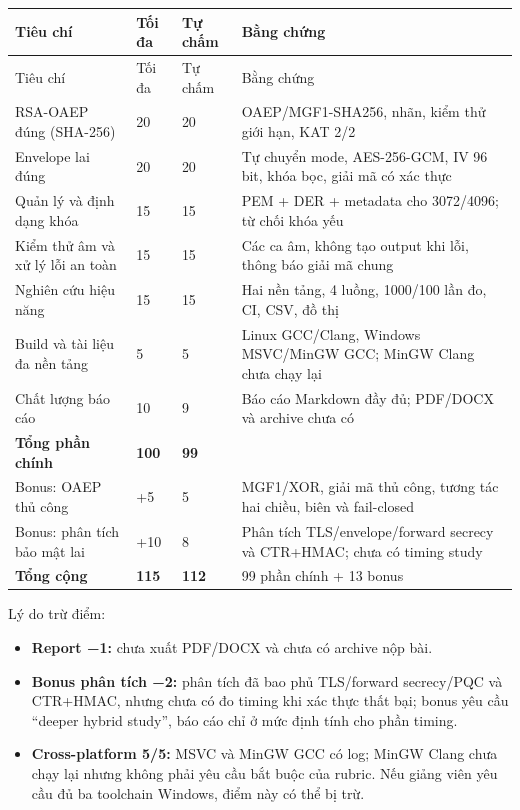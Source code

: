\documentclass[12pt,a4paper,oneside]{report}
\begin{document}
\begin{longtable}{p{}p{}p{}p{}}
\toprule
Tiêu chí & Tối đa & Tự chấm & Bằng chứng \\
\midrule
\endfirsthead
\toprule
Tiêu chí & Tối đa & Tự chấm & Bằng chứng \\
\midrule
\endhead
RSA-OAEP đúng (SHA-256) & 20 & 20 & OAEP/MGF1-SHA256, nhãn, kiểm thử giới hạn, KAT 2/2 \\
Envelope lai đúng & 20 & 20 & Tự chuyển mode, AES-256-GCM, IV 96 bit, khóa bọc, giải mã có xác thực \\
Quản lý và định dạng khóa & 15 & 15 & PEM + DER + metadata cho 3072/4096; từ chối khóa yếu \\
Kiểm thử âm và xử lý lỗi an toàn & 15 & 15 & Các ca âm, không tạo output khi lỗi, thông báo giải mã chung \\
Nghiên cứu hiệu năng & 15 & 15 & Hai nền tảng, 4 luồng, 1000/100 lần đo, CI, CSV, đồ thị \\
Build và tài liệu đa nền tảng & 5 & 5 & Linux GCC/Clang, Windows MSVC/MinGW GCC; MinGW Clang chưa chạy lại \\
Chất lượng báo cáo & 10 & 9 & Báo cáo Markdown đầy đủ; PDF/DOCX và archive chưa có \\
\textbf{Tổng phần chính} & \textbf{100} & \textbf{99} &  \\
Bonus: OAEP thủ công & +5 & 5 & MGF1/XOR, giải mã thủ công, tương tác hai chiều, biên và fail-closed \\
Bonus: phân tích bảo mật lai & +10 & 8 & Phân tích TLS/envelope/forward secrecy và CTR+HMAC; chưa có timing study \\
\textbf{Tổng cộng} & \textbf{115} & \textbf{112} & 99 phần chính + 13 bonus \\
\bottomrule
\end{longtable}


Lý do trừ điểm:


\begin{itemize}[leftmargin=*]
\item \textbf{Report −1:} chưa xuất PDF/DOCX và chưa có archive nộp bài.
\item \textbf{Bonus phân tích −2:} phân tích đã bao phủ TLS/forward secrecy/PQC và CTR+HMAC, nhưng chưa có đo timing khi xác thực thất bại; bonus yêu cầu “deeper hybrid study”, báo cáo chỉ ở mức định tính cho phần timing.
\item \textbf{Cross-platform 5/5:} MSVC và MinGW GCC có log; MinGW Clang chưa chạy lại nhưng không phải yêu cầu bắt buộc của rubric. Nếu giảng viên yêu cầu đủ ba toolchain Windows, điểm này có thể bị trừ.
\end{itemize}
\end{document}

